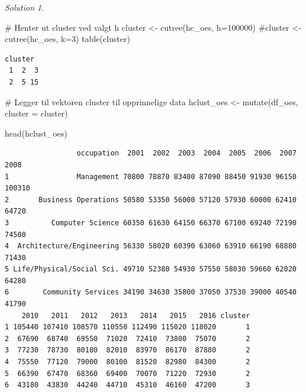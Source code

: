 \documentclass[
  letterpaper,
  DIV=11,
  numbers=noendperiod]{scrreprt}
\newenvironment{Shaded}{\begin{snugshade}}{\end{snugshade}}
\newcommand{\AttributeTok}[1]{\textcolor[rgb]{0.40,0.45,0.13}{#1}}
\newcommand{\CommentTok}[1]{\textcolor[rgb]{0.37,0.37,0.37}{#1}}
\newcommand{\DecValTok}[1]{\textcolor[rgb]{0.68,0.00,0.00}{#1}}
\newcommand{\FunctionTok}[1]{\textcolor[rgb]{0.28,0.35,0.67}{#1}}
\newcommand{\NormalTok}[1]{\textcolor[rgb]{0.00,0.23,0.31}{#1}}
\newcommand{\OtherTok}[1]{\textcolor[rgb]{0.00,0.23,0.31}{#1}}
\theoremstyle{definition}
\theoremstyle{remark}
\newtheorem*{solution}{Solution}
\begin{document}
\begin{solution}
\begin{figure}[H]
{}

\end{figure}

\begin{Shaded}
\begin{Highlighting}[]
\CommentTok{\# Henter ut cluster ved valgt h}
\NormalTok{cluster }\OtherTok{\textless{}{-}} \FunctionTok{cutree}\NormalTok{(hc\_oes, }\AttributeTok{h=}\DecValTok{100000}\NormalTok{)}
\CommentTok{\#cluster \textless{}{-} cutree(hc\_oes, k=3)}
\FunctionTok{table}\NormalTok{(cluster)}
\end{Highlighting}
\end{Shaded}

\begin{verbatim}
cluster
 1  2  3 
 2  5 15 
\end{verbatim}

\begin{Shaded}
\begin{Highlighting}[]
\CommentTok{\# Legger til vektoren cluster til opprinnelige data}
\NormalTok{hclust\_oes }\OtherTok{\textless{}{-}} \FunctionTok{mutate}\NormalTok{(df\_oes, }\AttributeTok{cluster =}\NormalTok{ cluster)}

\FunctionTok{head}\NormalTok{(hclust\_oes)}
\end{Highlighting}
\end{Shaded}

\begin{verbatim}
                 occupation  2001  2002  2003  2004  2005  2006  2007   2008
1                Management 70800 78870 83400 87090 88450 91930 96150 100310
2       Business Operations 50580 53350 56000 57120 57930 60000 62410  64720
3          Computer Science 60350 61630 64150 66370 67100 69240 72190  74500
4  Architecture/Engineering 56330 58020 60390 63060 63910 66190 68880  71430
5 Life/Physical/Social Sci. 49710 52380 54930 57550 58030 59660 62020  64280
6        Community Services 34190 34630 35800 37050 37530 39000 40540  41790
    2010   2011   2012   2013   2014   2015   2016 cluster
1 105440 107410 108570 110550 112490 115020 118020       1
2  67690  68740  69550  71020  72410  73800  75070       2
3  77230  78730  80180  82010  83970  86170  87880       2
4  75550  77120  79000  80100  81520  82980  84300       2
5  66390  67470  68360  69400  70070  71220  72930       2
6  43180  43830  44240  44710  45310  46160  47200       3
\end{verbatim}


\end{solution}
\end{document}
